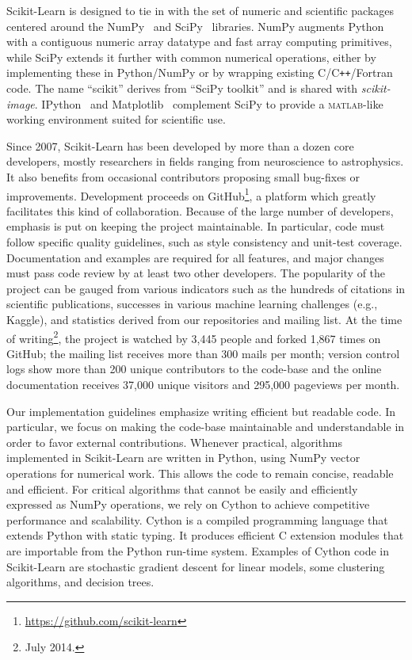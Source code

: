 Scikit-Learn is designed to tie in with the set of numeric and scientific
packages centered around the NumPy~\citep{oliphant:2007} and
SciPy~\citep{vanderwalt:2011} libraries. NumPy augments Python with a
contiguous numeric array datatype and fast array computing primitives, while
SciPy extends it further with common numerical operations, either by
implementing these in Python/NumPy or by wrapping existing
C/C{}\verb!++!/Fortran code. The name ``scikit'' derives from ``SciPy toolkit''
and is shared with \textit{scikit-image}. IPython~\citep{perez:2007} and
Matplotlib~\citep{hunter:2007} complement SciPy to provide a
\textsc{matlab}-like working environment suited for scientific use.

Since 2007, Scikit-Learn has been developed by more than a dozen core
developers, mostly researchers in fields ranging from neuro\-science to
astro\-physics. It also benefits from occasional contributors proposing small
bug-fixes or improvements. Development proceeds on
GitHub\footnote{\url{https://github.com/scikit-learn}}, a platform which
greatly facilitates this kind of collaboration. Because of the large number of
developers, emphasis is put on keeping the project maintainable. In particular,
code must follow specific quality guidelines, such as style consistency and
unit-test coverage. Documentation and examples are required for all features,
and major changes must pass code review by at least two other developers.
The popularity of the project can be gauged from various indicators such as the hundreds
of citations in scientific publications, successes in various machine learning
challenges (e.g., Kaggle), and statistics derived from our
repositories and mailing list.  At the time of writing\footnote{July 2014.}, the project is watched
by 3,445 people and forked 1,867 times on GitHub; the mailing list receives more
than 300 mails per month; version control logs
show more than 200 unique contributors to the code-base and the online documentation
receives 37,000 unique visitors and 295,000 pageviews per month.

Our implementation guidelines emphasize writing efficient but readable code. In
particular, we focus on making the code-base maintainable and understandable in
order to favor external contributions. Whenever practical, algorithms
implemented in Scikit-Learn are written in Python, using NumPy vector
operations for numerical work. This allows the code to remain concise, readable
and efficient. For critical algorithms that cannot be easily and efficiently
expressed as NumPy operations, we rely on Cython \citep{behnel:2011} to achieve
competitive performance and scalability. Cython is a compiled programming
language that extends Python with static typing. It produces efficient C
extension modules that are importable from the Python run-time system. Examples
of Cython code in Scikit-Learn are stochastic gradient descent for linear
models, some clustering algorithms, and decision trees.

